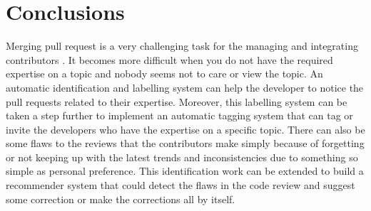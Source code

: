\section{Conclusions}
\label{sect:conclusions}
Merging pull request is a very challenging task for the managing and integrating contributors \cite{Gousios2015}. It becomes more difficult when you do not have the required expertise on a topic and nobody seems not to care or view the topic. An automatic identification and labelling system can help the developer to notice the pull requests related to their expertise. Moreover, this labelling system can be taken a step further to implement an automatic tagging system that can tag or invite the developers who have the expertise on a specific topic. There can also be some flaws to the reviews that the contributors make simply because of forgetting or not keeping up with the latest trends and inconsistencies due to something so simple as personal preference. This identification work can be extended to build a recommender system that could detect the flaws in the code review and suggest some correction or make the corrections all by itself. 
